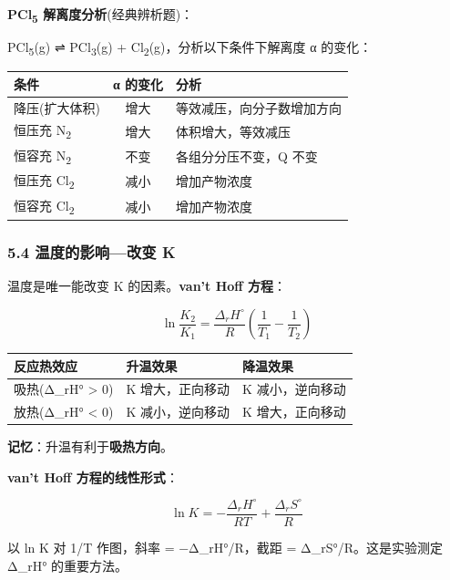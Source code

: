 \documentclass[a4paper,11pt]{ctexart}
\newcounter{none}
\begin{document}
\textbf{PCl\textsubscript{5} 解离度分析}(经典辨析题)：

PCl\textsubscript{5}(g) ⇌ PCl\textsubscript{3}(g) + Cl\textsubscript{2}(g)，分析以下条件下解离度 α 的变化：

{\def\LTcaptype{none} %
\begin{longtable}[]{@{}lcl@{}}
\toprule\noalign{}
条件 & α 的变化 & 分析 \\
\midrule\noalign{}
\endhead
\bottomrule\noalign{}
\endlastfoot
降压(扩大体积) & 增大 & 等效减压，向分子数增加方向 \\
恒压充 N\textsubscript{2} & 增大 & 体积增大，等效减压 \\
恒容充 N\textsubscript{2} & 不变 & 各组分分压不变，Q 不变 \\
恒压充 Cl\textsubscript{2} & 减小 & 增加产物浓度 \\
恒容充 Cl\textsubscript{2} & 减小 & 增加产物浓度 \\
\end{longtable}
}

\subsubsection{5.4 温度的影响---改变 K}\label{ux6e29ux5ea6ux7684ux5f71ux54cdux6539ux53d8-k}

温度是唯一能改变 K 的因素。\textbf{van't Hoff 方程}：

\[
\boxed{\ln\frac{K_2}{K_1} = \frac{\Delta_rH^\circ}{R}\left(\frac{1}{T_1} - \frac{1}{T_2}\right)}
\]

{\def\LTcaptype{none} %
\begin{longtable}[]{@{}lll@{}}
\toprule\noalign{}
反应热效应 & 升温效果 & 降温效果 \\
\midrule\noalign{}
\endhead
\bottomrule\noalign{}
\endlastfoot
吸热(Δ\_rH° \textgreater{} 0) & K 增大，正向移动 & K 减小，逆向移动 \\
放热(Δ\_rH° \textless{} 0) & K 减小，逆向移动 & K 增大，正向移动 \\
\end{longtable}
}

\textbf{记忆}：升温有利于\textbf{吸热方向}。

\textbf{van't Hoff 方程的线性形式}：

\[
\ln K = -\frac{\Delta_rH^\circ}{RT} + \frac{\Delta_rS^\circ}{R}
\]

以 ln K 对 1/T 作图，斜率 = −Δ\_rH°/R，截距 = Δ\_rS°/R。这是实验测定 Δ\_rH° 的重要方法。
\end{document}
